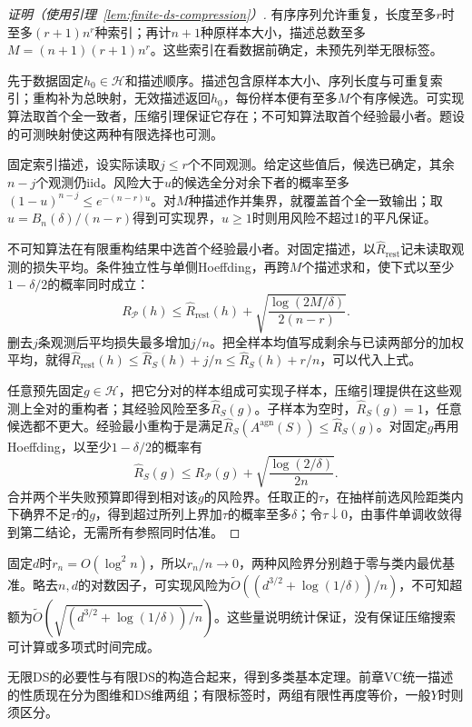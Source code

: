 \begin{proof}[证明（使用引理~\ref{lem:finite-ds-compression}）]
有序序列允许重复，长度至多$r$时至多$(r+1)n^r$种索引；再计$n+1$种原样本大小，描述总数至多$M=(n+1)(r+1)n^r$。这些索引在看数据前确定，未预先列举无限标签。

先于数据固定$h_0\in\mathcal H$和描述顺序。描述包含原样本大小、序列长度与可重复索引；重构补为总映射，无效描述返回$h_0$，每份样本便有至多$M$个有序候选。可实现算法取首个全一致者，压缩引理保证它存在；不可知算法取首个经验最小者。题设的可测映射使这两种有限选择也可测。

固定索引描述，设实际读取$j\leq r$个不同观测。给定这些值后，候选已确定，其余$n-j$个观测仍iid。风险大于$u$的候选全分对余下者的概率至多$(1-u)^{n-j}\leq e^{-(n-r)u}$。对$M$种描述作并集界，就覆盖首个全一致输出；取$u=B_n(\delta)/(n-r)$得到可实现界，$u\geq1$时则用风险不超过1的平凡保证。

不可知算法在有限重构结果中选首个经验最小者。对固定描述，以$\hat R_{\mathrm{rest}}$记未读取观测的损失平均。条件独立性与单侧Hoeffding，再跨$M$个描述求和，使下式以至少$1-\delta/2$的概率同时成立：
\[
 R_{\mathcal P}(h)\leq\hat R_{\mathrm{rest}}(h)
       +\sqrt{\frac{\log(2M/\delta)}{2(n-r)}}.
\]
删去$j$条观测后平均损失最多增加$j/n$。把全样本均值写成剩余与已读两部分的加权平均，就得$\hat R_{\mathrm{rest}}(h)\leq\hat R_S(h)+j/n\leq\hat R_S(h)+r/n$，可以代入上式。

任意预先固定$g\in\mathcal H$，把它分对的样本组成可实现子样本，压缩引理提供在这些观测上全对的重构者；其经验风险至多$\hat R_S(g)$。子样本为空时，$\hat R_S(g)=1$，任意候选都不更大。经验最小重构于是满足$\hat R_S(A^{\mathrm{agn}}(S))\leq\hat R_S(g)$。对固定$g$再用Hoeffding，以至少$1-\delta/2$的概率有
\[
 \hat R_S(g)\leq R_{\mathcal P}(g)
       +\sqrt{\frac{\log(2/\delta)}{2n}}.
\]
合并两个半失败预算即得到相对该$g$的风险界。任取正的$\tau$，在抽样前选风险距类内下确界不足$\tau$的$g$，得到超过所列上界加$\tau$的概率至多$\delta$；令$\tau\downarrow0$，由事件单调收敛得到第二结论，无需所有参照同时估准。
\end{proof}

固定$d$时$r_n=O(\log^2n)$，所以$r_n/n\to0$，两种风险界分别趋于零与类内最优基准。略去$n,d$的对数因子，可实现风险为$\widetilde O((d^{3/2}+\log(1/\delta))/n)$，不可知超额为$\widetilde O(\sqrt{(d^{3/2}+\log(1/\delta))/n})$。这些量说明统计保证，没有保证压缩搜索可计算或多项式时间完成。

无限DS的必要性与有限DS的构造合起来，得到多类基本定理。前章VC统一描述的性质现在分为图维和DS维两组；有限标签时，两组有限性再度等价，一般$Y$时则须区分。

